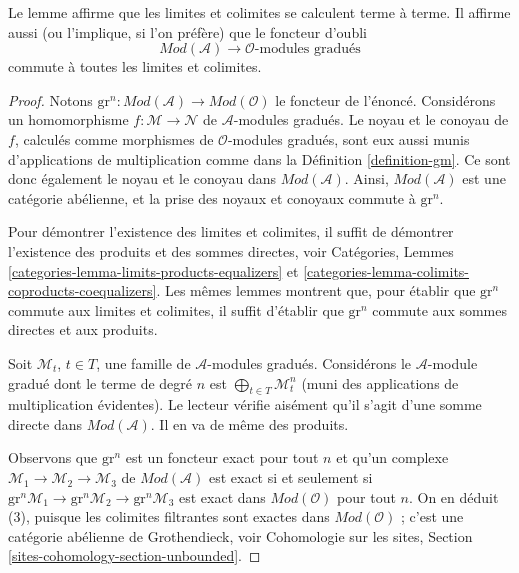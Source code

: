 \noindent
Le lemme affirme que les limites et colimites se calculent terme à terme. Il
affirme aussi (ou l'implique, si l'on préfère) que le foncteur d'oubli
$$
\textit{Mod}(\mathcal{A})
\longrightarrow
\mathcal{O}\text{-modules}\text{ gradués}
$$
commute à toutes les limites et colimites.

\begin{proof}
Notons
$\text{gr}^n : \textit{Mod}(\mathcal{A}) \to \textit{Mod}(\mathcal{O})$
le foncteur de l'énoncé. Considérons un homomorphisme
$f : \mathcal{M} \to \mathcal{N}$ de $\mathcal{A}$-modules gradués.
Le noyau et le conoyau de $f$, calculés comme morphismes de
$\mathcal{O}$-modules gradués, sont eux aussi munis d'applications de
multiplication comme dans la Définition \ref{definition-gm}. Ce sont donc
également le noyau et le conoyau dans $\textit{Mod}(\mathcal{A})$.
Ainsi, $\textit{Mod}(\mathcal{A})$ est une catégorie abélienne, et la prise
des noyaux et conoyaux commute à $\text{gr}^n$.

\medskip\noindent
Pour démontrer l'existence des limites et colimites, il suffit de démontrer
l'existence des produits et des sommes directes, voir Catégories, Lemmes
\ref{categories-lemma-limits-products-equalizers} et
\ref{categories-lemma-colimits-coproducts-coequalizers}.
Les mêmes lemmes montrent que, pour établir que $\text{gr}^n$ commute aux
limites et colimites, il suffit d'établir que $\text{gr}^n$ commute aux sommes directes
et aux produits.

\medskip\noindent
Soit $\mathcal{M}_t$, $t \in T$, une famille de $\mathcal{A}$-modules
gradués. Considérons le $\mathcal{A}$-module gradué dont le terme de degré $n$
est $\bigoplus_{t \in T} \mathcal{M}_t^n$ (muni des applications de
multiplication évidentes). Le lecteur vérifie aisément qu'il s'agit d'une
somme directe dans $\textit{Mod}(\mathcal{A})$. Il en va de même des produits.

\medskip\noindent
Observons que $\text{gr}^n$ est un foncteur exact pour tout $n$ et qu'un
complexe $\mathcal{M}_1 \to \mathcal{M}_2 \to \mathcal{M}_3$ de
$\textit{Mod}(\mathcal{A})$ est exact si et seulement si
$\text{gr}^n\mathcal{M}_1 \to \text{gr}^n\mathcal{M}_2 \to
\text{gr}^n\mathcal{M}_3$ est exact dans $\textit{Mod}(\mathcal{O})$
pour tout $n$. On en déduit (3), puisque les colimites filtrantes sont exactes
dans $\textit{Mod}(\mathcal{O})$ ; c'est une catégorie abélienne de
Grothendieck, voir Cohomologie sur les sites, Section
\ref{sites-cohomology-section-unbounded}.
\end{proof}






